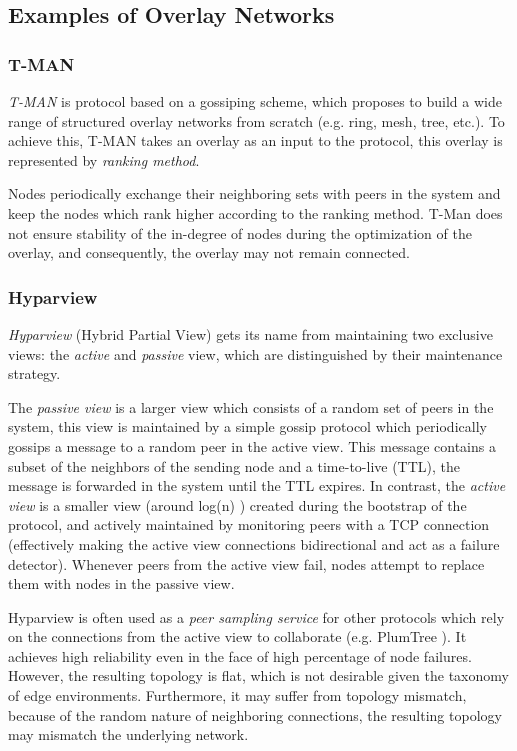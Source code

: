 \subsection{Examples of Overlay Networks}

\subsubsection*{T-MAN}

\textit{T-MAN} \cite{jelasity2005t} is protocol based on a gossiping scheme, which proposes to build a wide range of structured overlay networks from scratch (e.g. ring, mesh, tree, etc.). To achieve this, T-MAN takes an overlay as an input to the protocol, this overlay is represented by \textit{ranking method}. 

Nodes periodically exchange their neighboring sets with peers in the system and keep the nodes which rank higher according to the ranking method.  T-Man does not ensure stability of the in-degree of nodes during the optimization of the overlay, and consequently, the overlay may not remain connected. 

\subsubsection*{Hyparview}

\textit{Hyparview} \cite{Hyparview} (Hybrid Partial View) gets its name from maintaining two exclusive views: the \textit{active} and \textit{passive} view, which are distinguished by their maintenance strategy. 

The \textit{passive view} is a larger view which consists of a random set of peers in the system, this view is maintained by a simple gossip protocol which periodically gossips a message to a random peer in the active view. This message contains a subset of the neighbors of the sending node and a time-to-live (TTL), the message is forwarded in the system until the TTL expires. In contrast, the \textit{active view} is a smaller view (around log(n) ) created during the bootstrap of the protocol, and actively maintained by monitoring peers with a TCP connection (effectively making the active view connections bidirectional and act as a failure detector). Whenever peers from the active view fail, nodes attempt to replace them with nodes in the passive view.

Hyparview is often used as a \textit{peer sampling service} for other protocols which rely on the connections from the active view to collaborate (e.g. PlumTree \cite{leitao2007epidemic}). It achieves high reliability even in the face of high percentage of node failures. However, the resulting topology is flat, which is not desirable given the taxonomy of edge environments. Furthermore, it may suffer from topology mismatch, because of the random nature of neighboring connections, the resulting topology may mismatch the underlying network.

